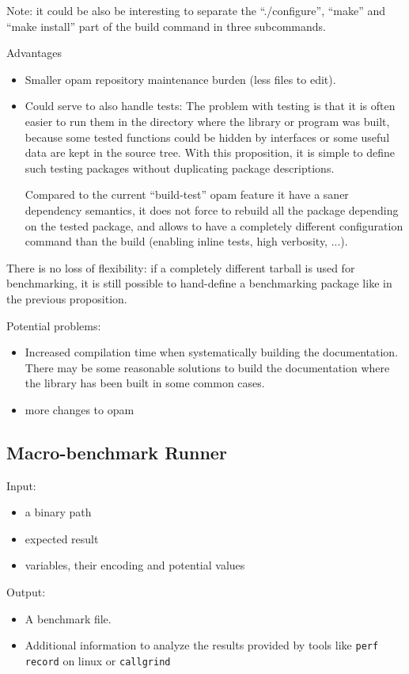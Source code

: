 \documentclass[11pt,a4paper]{article}
\begin{document}
Note: it could be also be interesting to separate the ``./configure'',
``make'' and ``make install'' part of the build command in three
subcommands.

Advantages
\begin{itemize}
\item Smaller opam repository maintenance burden (less files to edit).
\item Could serve to also handle tests: The problem with testing is
  that it is often easier to run them in the directory where the
  library or program was built, because some tested functions could be
  hidden by interfaces or some useful data are kept in the source
  tree. With this proposition, it is simple to define such testing
  packages without duplicating package descriptions.

  Compared to the current ``build-test'' opam feature it have a saner
  dependency semantics, it does not force to rebuild all the package
  depending on the tested package, and allows to have a completely
  different configuration command than the build (enabling inline
  tests, high verbosity, ...).
\end{itemize}

There is no loss of flexibility: if a completely different tarball is
used for benchmarking, it is still possible to hand-define a
benchmarking package like in the previous proposition.

Potential problems:
\begin{itemize}
\item Increased compilation time when systematically building the
  documentation. There may be some reasonable solutions to build the
  documentation where the library has been built in some common cases.
\item more changes to opam
\end{itemize}

\subsection{Macro-benchmark Runner}

Input:
\begin{itemize}
\item a binary path
\item expected result
\item variables, their encoding and potential values
\end{itemize}

Output:
\begin{itemize}
\item A benchmark file.
\item Additional information to analyze the results provided by
  tools like \texttt{perf record} on linux or \texttt{callgrind}
\end{itemize}
\end{document}
